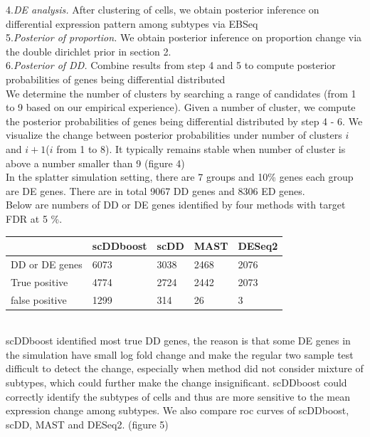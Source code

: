 \documentclass[11pt]{amsart}
\begin{document}
4.\textit{DE analysis.} After clustering of cells, we obtain posterior inference on differential expression pattern among subtypes via EBSeq\cite{ref:Leng}\\
5.\textit{Posterior of proportion.} We obtain posterior inference on proportion change via the double dirichlet prior in section 2. \\
6.\textit{Posterior of DD.} Combine results from step 4 and 5 to compute posterior probabilities of genes being differential distributed\\
We determine the number of clusters by searching a range of candidates (from 1 to 9 based on our empirical experience). Given a number of cluster, we compute the posterior probabilities of genes being differential distributed by step 4 - 6. We visualize the change between posterior probabilities under number of clusters $i$ and $i + 1$($i$ from 1 to 8). It typically remains stable when number of cluster is above a number smaller than 9 (figure 4)\\
In the splatter simulation setting, there are 7 groups and 10\% genes each group are DE genes. There are in total 9067 DD genes and 8306 ED genes.\\
Below are numbers of DD or DE genes identified by four methods with target FDR at 5 \%. \\
\begin{tabular}{ |p{3cm}|p{3cm}|p{3cm}|p{3cm}|p{3cm}|}
\hline
 & scDDboost & scDD & MAST & DESeq2\\
\hline
\hline
DD or DE genes & 6073 & 3038 & 2468 & 2076\\
\hline
True positive & 4774 & 2724 & 2442 & 2073\\
\hline
false positive & 1299 & 314 & 26 & 3\\
\hline
\end{tabular}\\
scDDboost identified most true DD genes, the reason is that some DE genes in the simulation have small log fold change and make the regular two sample test difficult to detect the change, especially when method did not consider mixture of subtypes, which could further make the change insignificant. scDDboost could correctly identify the subtypes of cells and thus are more sensitive to the mean expression change among subtypes. We also compare roc curves of scDDboost, scDD, MAST and DESeq2. (figure 5)
\end{document}
